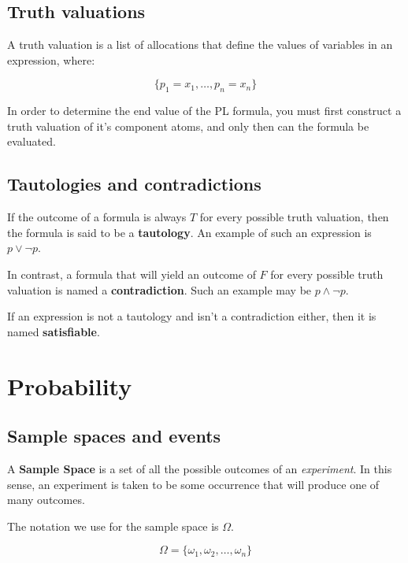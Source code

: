 \subsection{Truth valuations}

A truth valuation is a list of allocations that define the values of variables
in an expression, where:

\begin{dmath*}
	\{p_1=x_1,\dots, p_n=x_n\}
\end{dmath*}


In order to determine the end value of the PL formula, you must first construct
a truth valuation of it's component atoms, and only then can the formula be
evaluated.

\subsection{Tautologies and contradictions}

If the outcome of a formula is always $T$ for every possible truth valuation,
then the formula is said to be a {\bf tautology}. An example of such an
expression is $p \vee \neg p$.

In contrast, a formula that will yield an outcome of $F$ for every possible
truth valuation is named a {\bf contradiction}. Such an example may be $p \wedge
\neg p$.

If an expression is not a tautology and isn't a contradiction either, then it is
named {\bf satisfiable}.

\section{Probability}

\subsection{Sample spaces and events}

A {\bf Sample Space} is a set of all the possible outcomes of an {\it
experiment}. In this sense, an experiment is taken to be some occurrence that
will produce one of many outcomes.

The notation we use for the sample space is $\Omega$.

\begin{dmath*}
	\Omega = \{\omega_1, \omega_2, \ldots, \omega_n\}
\end{dmath*}

